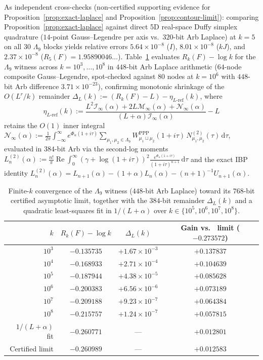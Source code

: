 \documentclass[11pt, reqno]{amsart}
\theoremstyle{remark}
\numberwithin{equation}{section}
\DeclareMathOperator{\re}{Re}
\newcommand{\dd}{\,\mathrm{d}}
\begin{document}
As independent cross-checks (non-certified supporting evidence for Proposition~\ref{prop:exact-laplace} and
Proposition~\ref{prop:contour-limit}): comparing Proposition~\ref{prop:exact-laplace} against direct 5D real-space
Duffy simplex quadrature ($14$-point Gauss--Legendre per axis vs.\ $320$-bit Arb Laplace) at $k = 5$ on all $30$
$\Lambda_9$ blocks yields relative errors $5.64 \times 10^{-8}$ ($I$), $8.01 \times 10^{-8}$ ($kJ$), and
$2.37 \times 10^{-8}$ ($R_5(F) = 1.95890046\dots$). Table~\ref{tab:finite-k} evaluates $R_k(F) - \log k$ for
the $\Lambda_9$ witness across $k = 10^3,\dots,10^8$ in $448$-bit Arb Laplace arithmetic ($64$-node composite
Gauss--Legendre, spot-checked against $80$ nodes at $k = 10^6$ with $448$-bit Arb difference $3.71 \times 10^{-23}$),
confirming monotonic shrinkage of the $O(L^r/k)$ remainder $\Delta_L(k) := (R_k(F) - L) - \eta_{L\text{-ref}}(k)$,
where
\[
\eta_{L\text{-ref}}(k) := \frac{L^2\mathcal{I}_\infty(\alpha) + 2L\mathcal{M}_\infty(\alpha) + \mathcal{N}_\infty(\alpha)}{(L+\alpha)\mathcal{I}_\infty(\alpha)} - L
\]
retains the $O(1)$ inner integral $\mathcal{N}_\infty(\alpha) := \frac{1}{2\pi}\int_{-\infty}^\infty e^{\Phi_\alpha(1+i\tau)}
\sum_{\mu_1,\mu_2\in\Lambda_9} W_{\mu_1\sqcup\mu_2}^{\mathrm{PPP}}(1+i\tau)\, N_{\mu_1,\mu_2}^{(2)}(\tau)\dd\tau$,
evaluated in $384$-bit Arb via the second-log moments
$L_n^{(2)}(\alpha) := \frac{n!}{\pi}\re\int_0^\infty (\gamma+\log(1+i\tau))^2 \frac{e^{\Phi_\alpha(1+i\tau)}}{(1+i\tau)^{n+1}}\dd\tau$
and the exact IBP identity $L_n^{(2)}(\alpha) = L_{n+1}(\alpha) - (1+\alpha)L_n(\alpha) - (n+1)^{-1}U_{n+1}(\alpha)$.

\begin{table}[ht]
\centering
\caption{Finite-$k$ convergence of the $\Lambda_9$ witness ($448$-bit Arb Laplace) toward its
$768$-bit certified asymptotic limit, together with the $384$-bit remainder $\Delta_L(k)$ and a
quadratic least-squares fit in $1/(L+\alpha)$ over $k \in \{10^5, 10^6, 10^7, 10^8\}$.}\label{tab:finite-k}
\small
\setlength{\tabcolsep}{7pt}
\begin{tabular}{@{}rccc@{}}
\toprule
$k$ & $R_k(F) - \log k$ & $\Delta_L(k)$ & Gain vs.\ \cite{Lewulis} limit ($-0.273572$) \\
\midrule
$10^3$ & $-0.135735$ & $+1.67 \times 10^{-3}$ & $+0.137837$ \\
$10^4$ & $-0.168933$ & $+2.71 \times 10^{-4}$ & $+0.104639$ \\
$10^5$ & $-0.187944$ & $+4.38 \times 10^{-5}$ & $+0.085628$ \\
$10^6$ & $-0.200383$ & $+6.56 \times 10^{-6}$ & $+0.073189$ \\
$10^7$ & $-0.209188$ & $+9.23 \times 10^{-7}$ & $+0.064384$ \\
$10^8$ & $-0.215757$ & $+1.24 \times 10^{-7}$ & $+0.057815$ \\
\midrule
$1/(L+\alpha)$ fit & $-0.260771$ & --- & $+0.012801$ \\
Certified limit & $\mathbf{-0.260989}$ & --- & $\mathbf{+0.012583}$ \\
\bottomrule
\end{tabular}
\end{table}
\end{document}

